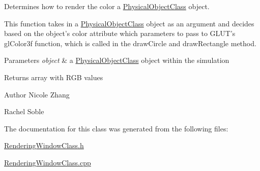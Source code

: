 Determines how to render the color a \hyperlink{classPhysicalObjectClass}{Physical\-Object\-Class} object. 

This function takes in a \hyperlink{classPhysicalObjectClass}{Physical\-Object\-Class} object as an argument and decides based on the object's color attribute which parameters to pass to G\-L\-U\-T's gl\-Color3f function, which is called in the draw\-Circle and draw\-Rectangle method.


\begin{DoxyParams}{Parameters}
{\em object} & a \hyperlink{classPhysicalObjectClass}{Physical\-Object\-Class} object within the simulation\\
\hline
\end{DoxyParams}
\begin{DoxyReturn}{Returns}
array with R\-G\-B values
\end{DoxyReturn}
\begin{DoxyAuthor}{Author}
Nicole Zhang 

Rachel Soble 
\end{DoxyAuthor}


The documentation for this class was generated from the following files\-:\begin{DoxyCompactItemize}
\item 
\hyperlink{RenderingWindowClass_8h}{Rendering\-Window\-Class.\-h}\item 
\hyperlink{RenderingWindowClass_8cpp}{Rendering\-Window\-Class.\-cpp}\end{DoxyCompactItemize}
